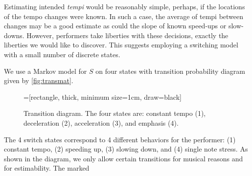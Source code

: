 \documentclass[12pt]{article}
\begin{document}
Estimating intended {\em tempi} would be reasonably simple, perhaps, 
if the locations of the tempo changes were known. In such a case,
the average of tempi between changes may be a good estimate as
could the slope of known speed-ups or slow-downs. However, performers
take liberties with these decisions, exactly the liberties we would
like to discover. This suggests employing a switching model with a
small number of discrete states.

We use a Markov model for $S$ on four states
with transition probability
diagram given by \autoref{fig:transmat}.
\begin{figure}[tb!]
  \centering
  =[rectangle,
  thick, minimum size=1cm, draw=black]
  \caption{Transition diagram. The four states are: constant tempo
    (1), deceleration (2), acceleration (3), and emphasis (4).\label{fig:transmat}}
\end{figure}
The 4 switch states correspond to 4 different behaviors for the
performer: (1) constant tempo, (2) speeding up, (3) slowing down, and
(4) single note stress. As shown in the diagram, we only allow certain
transitions for musical reasons and for estimability. The marked
\end{document}
